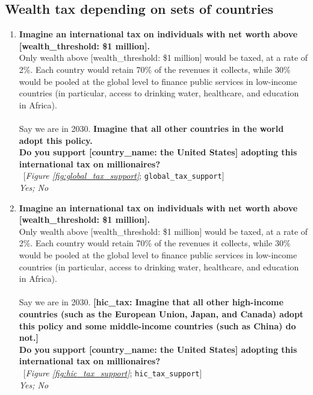  \subsection*{Wealth tax depending on sets of countries} 
 \begin{enumerate}[resume] 
\item  \label{q:global_tax_support} \textbf{Imagine an international tax on individuals with net worth above [wealth\_threshold: \$1 million].~}\\Only wealth above [wealth\_threshold: \$1 million] would be taxed, at a rate of 2\%. Each country would retain 70\% of the revenues it collects, while 30\% would be pooled at the global level to finance public services in low-income countries (in particular, access to drinking water, healthcare, and education in Africa). \\\\Say we are in 2030. \textbf{Imagine that all other countries in the world adopt this policy. \\Do you support [country\_name: the United States] adopting this international tax on millionaires?}\\ 
~[\textit{Figure \ref{fig:global_tax_support}}; 
\verb|global_tax_support|]
  \\ \textit{Yes; No}

\item  \label{q:hic_tax_support} \textbf{Imagine an international tax on individuals with net worth above [wealth\_threshold: \$1 million].~}\\Only wealth above [wealth\_threshold: \$1 million] would be taxed, at a rate of 2\%. Each country would retain 70\% of the revenues it collects, while 30\% would be pooled at the global level to finance public services in low-income countries (in particular, access to drinking water, healthcare, and education in Africa). \\\\Say we are in 2030. \textbf{[hic\_tax: Imagine that all other high-income countries (such as the European Union, Japan, and Canada) adopt this policy and some middle-income countries (such as China) do not.]}\textbf{~\\Do you support [country\_name: the United States] adopting this international tax on millionaires?}\\ 
~[\textit{Figure \ref{fig:hic_tax_support}}; 
\verb|hic_tax_support|]
  \\ \textit{Yes; No}


\end{enumerate}
